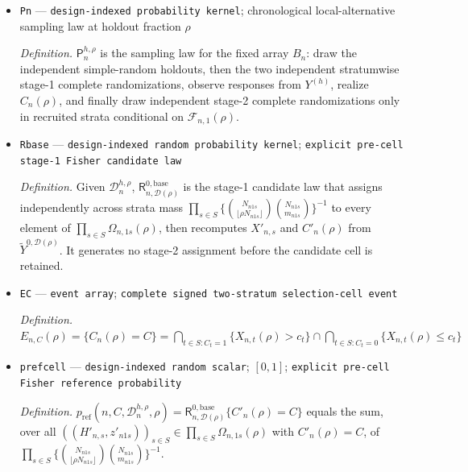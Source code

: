 \documentclass{article}
\begin{document}
\begin{itemize}
  \par\smallskip\noindent\emph{Definition.} \(\Omega_{n,C}(\mathcal D_n^{h,\rho},\rho)\) contains exactly the histories \(((H'_{n,s},z'_{n1s})_{s\in S},(z'_{n2s})_{s:C_s=1})\) such that \((H'_{n,s},z'_{n1s})\in\Omega_{n,1s}(\rho)\), \(C'_n(\rho)=C_n(\rho)=C\), and \(z'_{n2s}\in\{0,1\}^{N_{n2s}}\) with \(\sum_i z'_{n2si}=m_{n2s}\) for every retained stratum \(s\) satisfying \(C_s=1\). There is no stage-2 coordinate when \(C_s=0\).
  \item \texttt{Pn} --- \texttt{design-\allowbreak{}indexed probability kernel}; chronological local-alternative sampling law at holdout fraction \(\rho\)
  \par\smallskip\noindent\emph{Definition.} \(\mathsf P_n^{h,\rho}\) is the sampling law for the fixed array \(B_n\): draw the independent simple-random holdouts, then the two independent stratumwise stage-1 complete randomizations, observe responses from \(Y^{(h)}\), realize \(C_n(\rho)\), and finally draw independent stage-2 complete randomizations only in recruited strata conditional on \(\mathcal F_{n,1}(\rho)\).
  \item \texttt{Rbase} --- \texttt{design-\allowbreak{}indexed random probability kernel}; \texttt{explicit pre-\allowbreak{}cell stage-\allowbreak{}1 Fisher candidate law}
  \par\smallskip\noindent\emph{Definition.} Given \(\mathcal D_n^{h,\rho}\), \(\mathsf R_{n,\mathcal D(\rho)}^{0,\mathrm{base}}\) is the stage-1 candidate law that assigns independently across strata mass \(\prod_{s\in S}\{\binom{N_{n1s}}{\lfloor\rho N_{n1s}\rfloor}\binom{N_{n1s}}{m_{n1s}}\}^{-1}\) to every element of \(\prod_{s\in S}\Omega_{n,1s}(\rho)\), then recomputes \(X'_{n,s}\) and \(C'_n(\rho)\) from \(\widetilde Y^{0,\mathcal D(\rho)}\). It generates no stage-2 assignment before the candidate cell is retained.
  \item \texttt{EC} --- \texttt{event array}; \texttt{complete signed two-\allowbreak{}stratum selection-\allowbreak{}cell event}
  \par\smallskip\noindent\emph{Definition.} \(E_{n,C}(\rho)=\{C_n(\rho)=C\}=\bigcap_{t\in S:C_t=1}\{X_{n,t}(\rho)>c_t\}\cap\bigcap_{t\in S:C_t=0}\{X_{n,t}(\rho)\le c_t\}\)
  \item \texttt{prefcell} --- \texttt{design-\allowbreak{}indexed random scalar}; \([0,1]\); \texttt{explicit pre-\allowbreak{}cell Fisher reference probability}
  \par\smallskip\noindent\emph{Definition.} \(p_{\mathrm{ref}}(n,C,\mathcal D_n^{h,\rho},\rho)=\mathsf R_{n,\mathcal D(\rho)}^{0,\mathrm{base}}\{C'_n(\rho)=C\}\) equals the sum, over all \(((H'_{n,s},z'_{n1s}))_{s\in S}\in\prod_{s\in S}\Omega_{n,1s}(\rho)\) with \(C'_n(\rho)=C\), of \(\prod_{s\in S}\{\binom{N_{n1s}}{\lfloor\rho N_{n1s}\rfloor}\binom{N_{n1s}}{m_{n1s}}\}^{-1}\).

\end{itemize}
\end{document}
